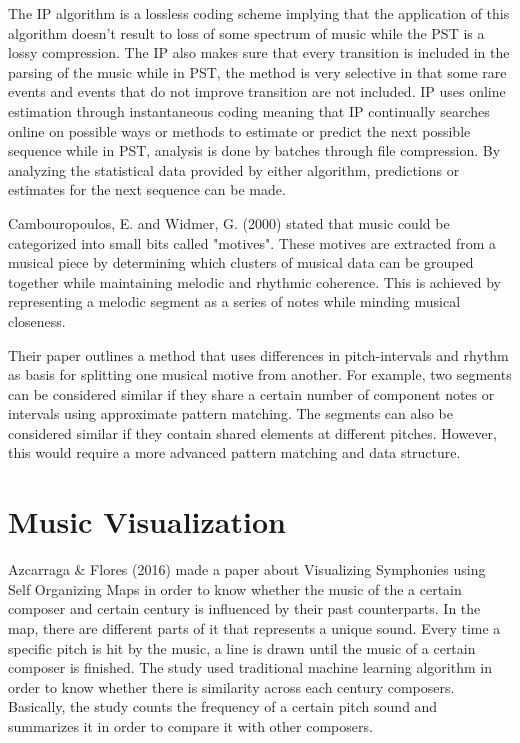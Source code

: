 The IP algorithm is a lossless coding scheme implying that the application of this algorithm doesn’t result to loss of some spectrum of music while the PST is a lossy compression. The IP also makes sure that every transition is included in the parsing of the music while in PST, the method is very selective in that some rare events and events that do not improve transition are not included. IP uses online estimation through instantaneous coding meaning that IP continually searches online on possible ways or methods to estimate or predict the next possible sequence while in PST, analysis is done by batches through file compression. By analyzing the statistical data provided by either algorithm, predictions or estimates for the next sequence can be made.

Cambouropoulos, E. and Widmer, G. (2000) stated that music could be categorized into small bits called "motives". These motives are extracted from a musical piece by determining which clusters of musical data can be grouped together while maintaining melodic and rhythmic coherence. This is achieved by representing a melodic segment as a series of notes while minding musical closeness. 

Their paper outlines a method that uses differences in pitch-intervals and rhythm as basis for splitting one musical motive from another. For example, two segments can be considered similar if they share a certain number of component notes or intervals using approximate pattern matching. The segments can also be considered similar if they contain shared elements at different pitches. However, this would require a more advanced pattern matching and data structure.

\section{Music Visualization}
Azcarraga \& Flores (2016) made a paper about Visualizing Symphonies using Self Organizing Maps in order to know whether the music of the a certain composer and certain century is influenced by their past counterparts. In the map, there are different parts of it that represents a unique sound. Every time a specific pitch is hit by the music, a line is drawn until the music of a certain composer is finished. The study used traditional machine learning algorithm in order to know whether there is similarity across each century composers. Basically, the study counts the frequency of a certain pitch sound and summarizes it in order to compare it with other composers.

